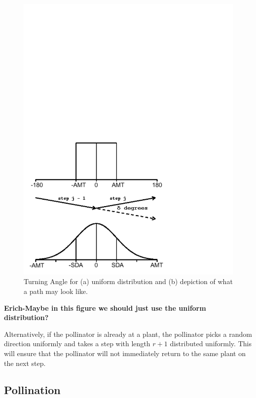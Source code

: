 \begin{figure}[h!]\label{TurningAngle}
\begin{center}
\includegraphics[scale=0.5,trim=0 30 150 510]{TADistribution.pdf}
\end{center}
\caption{Turning Angle for (a) uniform distribution and (b) depiction
of what a path may look like.}
\label{Figangle}
\end{figure}
{\bf Erich-Maybe in this figure we should just use the uniform distribution?}


Alternatively, if the pollinator is already at a plant, the pollinator picks a random direction uniformly
and takes a step with length $r+1$ distributed uniformly.  This will ensure that the pollinator will not immediately return to
the same plant on the next step.

\subsection{Pollination}

